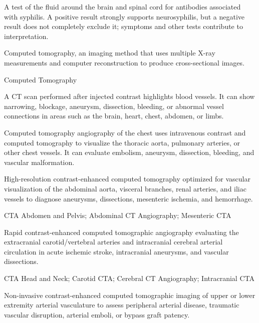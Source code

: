  A test of the fluid around the brain and spinal cord for antibodies associated with syphilis. A positive result strongly supports neurosyphilis, but a negative result does not completely exclude it; symptoms and other tests contribute to interpretation.

 Computed tomography, an imaging method that uses multiple X-ray measurements and computer reconstruction to produce cross-sectional images.

\synonyms
Computed Tomography

 A CT scan performed after injected contrast highlights blood vessels. It can show narrowing, blockage, aneurysm, dissection, bleeding, or abnormal vessel connections in areas such as the brain, heart, chest, abdomen, or limbs.

 Computed tomography angiography of the chest uses intravenous contrast and computed tomography to visualize the thoracic aorta, pulmonary arteries, or other chest vessels. It can evaluate embolism, aneurysm, dissection, bleeding, and vascular malformation.

 High-resolution contrast-enhanced computed tomography optimized for vascular visualization of the abdominal aorta, visceral branches, renal arteries, and iliac vessels to diagnose aneurysms, dissections, mesenteric ischemia, and hemorrhage.


\synonyms
CTA Abdomen and Pelvis; Abdominal CT Angiography; Mesenteric CTA

 Rapid contrast-enhanced computed tomographic angiography evaluating the extracranial carotid/vertebral arteries and intracranial cerebral arterial circulation in acute ischemic stroke, intracranial aneurysms, and vascular dissections.


\synonyms
CTA Head and Neck; Carotid CTA; Cerebral CT Angiography; Intracranial CTA

 Non-invasive contrast-enhanced computed tomographic imaging of upper or lower extremity arterial vasculature to assess peripheral arterial disease, traumatic vascular disruption, arterial emboli, or bypass graft patency.


